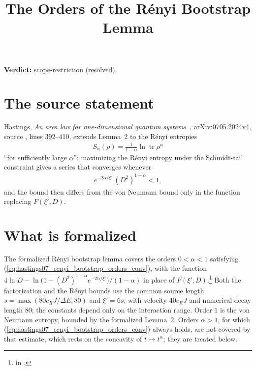 \documentclass{article}
\title{The Orders of the Rényi Bootstrap Lemma}
\author{}
\date{}
\providecommand{\gapnote}[2]{\par\noindent\textbf{Verdict:} #1 (#2).\par}
\begin{document}
\maketitle
\gapnote{scope-restriction}{resolved}

\section{The source statement}
Hastings, \emph{An area law for one-dimensional quantum systems}~\cite{Hastings2007AreaLaw},
\href{https://arxiv.org/abs/0705.2024v4}{arXiv:0705.2024v4}, source
, lines 392--410, extends Lemma~2 to the Rényi entropies
\begin{align}
 S_\alpha(\rho)=\frac1{1-\alpha}\ln\operatorname{tr}\rho^\alpha
 \label{eq:hastings07_renyi_bootstrap_orders_def}
\end{align}
``for sufficiently large $\alpha$'': maximizing the Rényi entropy under the
Schmidt-tail constraint gives a series that converges whenever
\begin{align}
 e^{-2\alpha/\xi'}\,(D^2)^{1-\alpha}<1,
 \label{eq:hastings07_renyi_bootstrap_orders_conv}
\end{align}
and the bound then differs from the von Neumann bound only in the function
replacing $F(\xi',D)$.

\section{What is formalized}
The formalized Rényi bootstrap lemma covers the orders $0<\alpha<1$ satisfying
(\ref{eq:hastings07_renyi_bootstrap_orders_conv}), with the function
$4\ln D-\ln\bigl(1-(D^2)^{1-\alpha}e^{-2\alpha/\xi'}\bigr)/(1-\alpha)$ in place
of $F(\xi',D)$.\footnote{
    in .}
Both the factorization and the Rényi bounds use the common source
length $s=\max(80c_RJ/\Delta E,80)$ and $\xi'=6s$, with velocity
$40c_RJ$ and numerical decay length $80$; the constants depend only on
the interaction range.
Order $1$ is the von Neumann entropy, bounded by the formalized
Lemma~2. Orders $\alpha>1$, for which
(\ref{eq:hastings07_renyi_bootstrap_orders_conv}) always holds, are not covered
by that estimate, which rests on the concavity of $t\mapsto t^\alpha$; they are
treated below.
\end{document}
